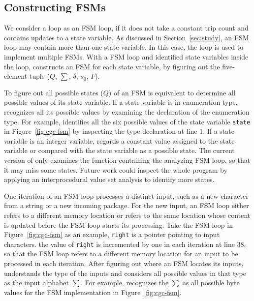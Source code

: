 \subsection{Constructing FSMs}
\label{sec:tuple}
We consider a loop as an FSM loop, if it does not take a constant trip count 
and contains updates to a state variable.
As discussed in Section~\ref{sec:study}, 
an FSM loop may contain more than one state variable. 
In this case, the loop is used to implement multiple FSMs.
With a FSM loop and identified state variables inside the loop, 
\Tool{} constructs an FSM for each state variable, 
by figuring out the five-element 
tuple ($Q$, $\sum$, $\delta$, $s_0$, $F$). 

To figure out all possible states ($Q$) of an FSM 
is equivalent to determine all possible values of its state variable. 
If a state variable is in enumeration type, 
\Tool{} recognizes all its possible values 
by examining the declaration of the enumeration type. 
For example, \Tool{} identifies all the six possible values of 
the state variable \texttt{state} in Figure~\ref{fig:cgc-fsm} 
by inspecting the type declaration at line 1. 
If a state variable is an integer variable, \Tool{} regards 
a constant value assigned to the state variable or 
compared with the state variable as a possible state. 
The current version of \Tool{} only examines the function
containing the analyzing FSM loop, so that it may miss some states. 
Future work could inspect the whole program by 
applying an interprocedural 
value set analysis to identify more states. 

One iteration of an FSM loop processes a distinct input, 
such as a new character from a string or a new incoming package. 
For the new input, an FSM loop either refers to a different memory location 
or refers to the same location whose content is updated before 
the FSM loop starts its processing. 
Take the FSM loop in Figure~\ref{fig:cgc-fsm} as an example, 
\texttt{right} is a pointer pointing to input characters.
the value of \texttt{right} is incremented by one in each iteration at line 38, 
so that the FSM loop refers to a different memory location 
for an input to be processed in each iteration.  
After figuring out where an FSM locates its inputs, 
\Tool{} understands the type of the inputs 
and considers all possible values in that type
as the input alphabet $\sum$. For example, \Tool{} recognizes 
the $\sum$ as all possible byte values 
for the FSM implementation in Figure~\ref{fig:cgc-fsm}. 

